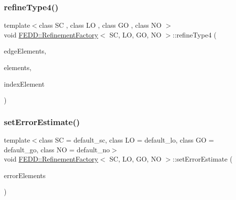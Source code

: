 \subsubsection{\texorpdfstring{refine\+Type4()}{refineType4()}}
{\footnotesize\ttfamily template$<$class SC , class LO , class GO , class NO $>$ \\
void \hyperlink{classFEDD_1_1RefinementFactory}{F\+E\+D\+D\+::\+Refinement\+Factory}$<$ SC, LO, GO, NO $>$\+::refine\+Type4 (\begin{DoxyParamCaption}\item[{\hyperlink{classFEDD_1_1RefinementFactory_ae5285e990ec4632d6188a1280627ad13}{Edge\+Elements\+Ptr\+\_\+\+Type}}]{edge\+Elements,  }\item[{\hyperlink{classFEDD_1_1RefinementFactory_a0994b5b7b6d080048673941251999f2e}{Elements\+Ptr\+\_\+\+Type}}]{elements,  }\item[{int}]{index\+Element }\end{DoxyParamCaption})}

\mbox{\label{classFEDD_1_1RefinementFactory_a4532ed5c403d767f316e922a3d769853}} 
\subsubsection{\texorpdfstring{set\+Error\+Estimate()}{setErrorEstimate()}}
{\footnotesize\ttfamily template$<$class SC = default\+\_\+sc, class LO = default\+\_\+lo, class GO = default\+\_\+go, class NO = default\+\_\+no$>$ \\
void \hyperlink{classFEDD_1_1RefinementFactory}{F\+E\+D\+D\+::\+Refinement\+Factory}$<$ SC, LO, GO, NO $>$\+::set\+Error\+Estimate (\begin{DoxyParamCaption}\item[{vec\+\_\+dbl\+\_\+\+Type}]{error\+Elements }\end{DoxyParamCaption})\hspace{0.3cm}{\ttfamily [inline]}}

\mbox{\label{classFEDD_1_1RefinementFactory_a2ebf82a5deb92e26a48805fd470f6840}} 
